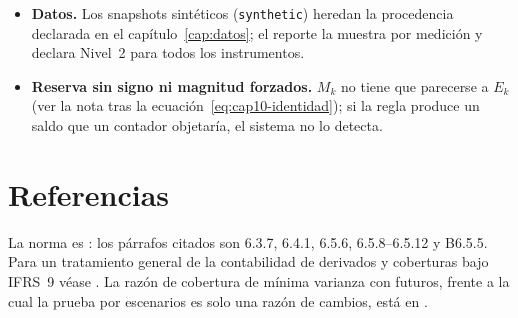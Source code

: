 \begin{limites}
\begin{itemize}
      que la documentación existiera ese día: solo controla el orden entre relaciones de la misma operación y avisa si se
      documenta más de un día después.
    \item \textbf{Datos.} Los snapshots sintéticos (\texttt{synthetic}) heredan la procedencia declarada en el
      capítulo~\ref{cap:datos}; el reporte la muestra por medición y declara Nivel~2 para todos los instrumentos.
    \item \textbf{Reserva sin signo ni magnitud forzados.} $M_k$ no tiene que parecerse a $E_k$ (ver la nota tras la
      ecuación~\eqref{eq:cap10-identidad}); si la regla produce un saldo que un contador objetaría, el sistema no lo detecta.
  \end{itemize}
\end{limites}

\section{Referencias}\label{sec:cap10-referencias}

La norma es \citet{iasb2014}: los párrafos citados son 6.3.7, 6.4.1, 6.5.6, 6.5.8--6.5.12 y B6.5.5. Para un tratamiento
general de la contabilidad de derivados y coberturas bajo IFRS~9 véase \citet{ramirez2015}. La razón de cobertura de
mínima varianza con futuros, frente a la cual la prueba por escenarios es solo una razón de cambios, está en
\citet{hull2018}.
